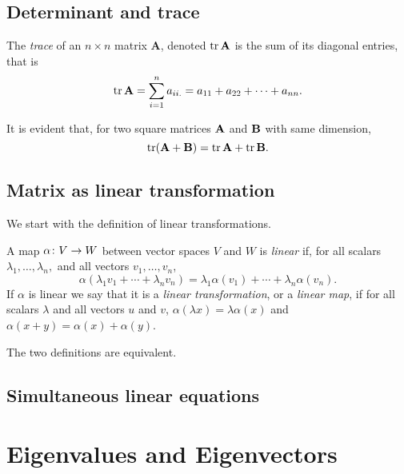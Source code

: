 \documentclass[main.tex]{subfiles}
\begin{document}
		\subsection{Determinant and trace}
			\begin{theorem}
				The \textit{trace}  of an $n \times n$ matrix $\mathbf{A}$, denoted $\operatorname{tr} \mathbf{A}$ is the sum of its diagonal entries, that is
				\begin{equation*}
					\operatorname{tr} \mathbf{A} = \sum_{i = 1}^{n} a_{ii.} = a_{11} + a_{22} + \cdots + a_{nn}.
				\end{equation*}
			\end{theorem}
			\begin{theorem}
				It is evident that, for two square matrices $\mathbf{A}$ and $\mathbf{B}$ with same dimension,
				\begin{equation*}
				\operatorname{tr}(\mathbf{A + B}) = \operatorname{tr}\mathbf{A} + \operatorname{tr}\mathbf{B}.
				\end{equation*}
			\end{theorem}
		
			
			
		\subsection{Matrix as linear transformation}
			We start with the definition of linear transformations.
			\begin{definition}
				A map $\alpha \colon V \rightarrow W$ between vector spaces $V$ and $W$ is \textit{linear} if, for all scalars $\lambda_1, \ldots, \lambda_n,$ and all vectors $v_1, \ldots, v_n$,
				\begin{equation*}
					\alpha\left(\lambda_1v_1 + \cdots + \lambda_n v_n\right) = \lambda_1\alpha(v_1) + \cdots + \lambda_n\alpha(v_n).
				\end{equation*}
			If $\alpha$ is linear we say that it is a \textit{linear transformation}, or a \textit{linear map}, if for all scalars $\lambda$ and all vectors $u$ and $v$, $\alpha(\lambda x) = \lambda\alpha(x)$ and $\alpha( x + y) = \alpha (x) + \alpha(y)$.
			\end{definition}
		The two definitions are equivalent.
		
		\subsection{Simultaneous linear equations}
		
		\section{Eigenvalues and Eigenvectors}
		
\end{document}
